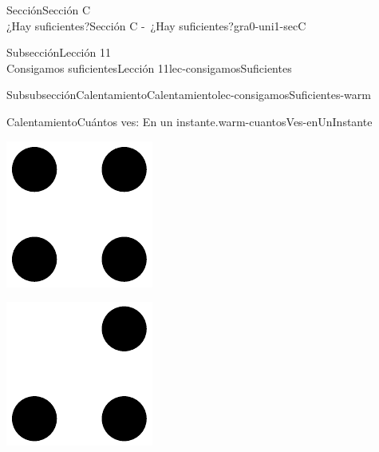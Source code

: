 \begin{sectionptx}{Sección}{{\Large Sección C\\}¿Hay suficientes?}{}{Sección C -~¿Hay suficientes?}{}{}{gra0-uni1-secC}
\begin{subsectionptx}{Subsección}{{\normalsize Lección 11\\[-0.05cm]}Consigamos suficientes}{}{Lección 11}{}{}{lec-consigamosSuficientes}
\begin{subsubsectionptx}{Subsubsección}{Calentamiento}{}{Calentamiento}{}{}{lec-consigamosSuficientes-warm}
\begin{exploration}{Calentamiento}{Cuántos ves: En un instante.}{warm-cuantosVes-enUnInstante}
\begin{sidebyside}{2}{0}{0}{0}
\begin{sbspanel}{0.5}
\includegraphics[max width=\linewidth, center]{external/svg-source/tikz-file-148153.pdf}
\end{sbspanel}%
\begin{sbspanel}{0.5}%
\includegraphics[max width=\linewidth, center]{external/svg-source/tikz-file-136326.pdf}

\end{sbspanel}
\end{sidebyside}
\end{exploration}
\end{subsubsectionptx}
\end{subsectionptx}
\end{sectionptx}
